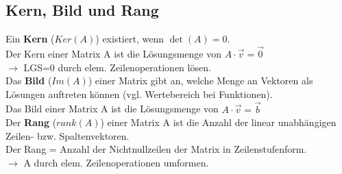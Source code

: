 \subsection{Kern, Bild und Rang}

Ein \textbf{Kern} (\(Ker(A)\)) existiert, wenn \(\det(A) = 0\).\\
Der Kern einer Matrix A ist die Lösungsmenge von \(A \cdot \vec{v} = \vec{0}\)\\
\(\rightarrow\) LGS=0 durch elem. Zeilenoperationen lösen.\\

\vspace*{3mm}
Das \textbf{Bild} (\(Im(A)\)) einer Matrix gibt an, welche Menge an Vektoren als Lösungen auftreten können (vgl. Wertebereich bei Funktionen).\\
Das Bild einer Matrix A ist die Lösungsmenge von \(A \cdot \vec{v} = \vec{b}\)\\

\vspace*{3mm}
Der \textbf{Rang} (\(rank(A)\)) einer Matrix A ist die Anzahl der linear unabhängigen Zeilen- bzw. Spaltenvektoren.\\
Der Rang = Anzahl der Nichtnullzeilen der Matrix in Zeilenstufenform.\\
\(\rightarrow\) A durch elem. Zeilenoperationen umformen.\\